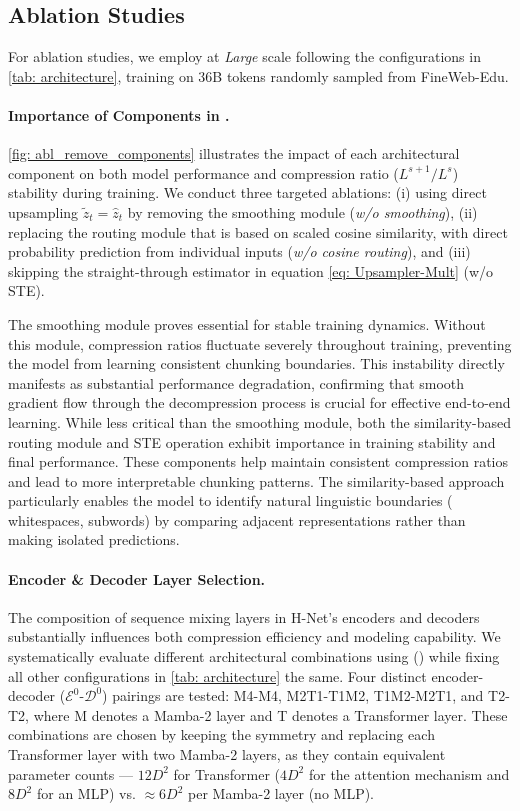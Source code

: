 

\subsection{Ablation Studies}
\label{sec: ablation_studies}
For ablation studies, we employ \model{} at \emph{Large} scale following the configurations in \cref{tab: architecture}, training on $36$B tokens randomly sampled from FineWeb-Edu.

\paragraph{Importance of Components in \model{}.}
\cref{fig: abl_remove_components} illustrates the impact of each architectural component on both model performance and compression ratio ($L^{s+1}/L^s$) stability during training.
We conduct three targeted ablations: (i) using direct upsampling $\tilde{z}_t = \hat{z}_t$ by removing the smoothing module (\emph{w/o smoothing}), (ii) replacing the routing module that is based on scaled cosine similarity, with direct probability prediction from individual inputs (\emph{w/o cosine routing}),
and (iii) skipping the straight-through estimator in equation \eqref{eq: Upsampler-Mult} (w/o STE).

The smoothing module proves essential for stable training dynamics.
Without this module, compression ratios fluctuate severely throughout training, preventing the model from learning consistent chunking boundaries.
This instability directly manifests as substantial performance degradation, confirming that smooth gradient flow through the decompression process is crucial for effective end-to-end learning.
While less critical than the smoothing module, both the similarity-based routing module and STE operation exhibit importance in training stability and final performance.
These components help maintain consistent compression ratios and lead to more interpretable chunking patterns.
The similarity-based approach particularly enables the model to identify natural linguistic boundaries (\eg{} whitespaces, subwords) by comparing adjacent representations rather than making isolated predictions.

\paragraph{Encoder \& Decoder Layer Selection.}
The composition of sequence mixing layers in H-Net's encoders and decoders substantially influences both compression efficiency and modeling capability.
We systematically evaluate different architectural combinations using \model{} (\onestage{}) while fixing all other configurations in \cref{tab: architecture} the same.
Four distinct encoder-decoder ($\mathcal{E}^0$-$\mathcal{D}^0$) pairings are tested: M4-M4, M2T1-T1M2, T1M2-M2T1, and T2-T2, where M denotes a Mamba-2 layer and T denotes a Transformer layer.
These combinations are chosen by keeping the symmetry and replacing each Transformer layer with two Mamba-2 layers, as they contain equivalent parameter counts --- $12D^2$ for Transformer ($4D^2$ for the attention mechanism and $8D^2$ for an MLP) vs. $\approx 6D^2$ per Mamba-2 layer (no MLP).

